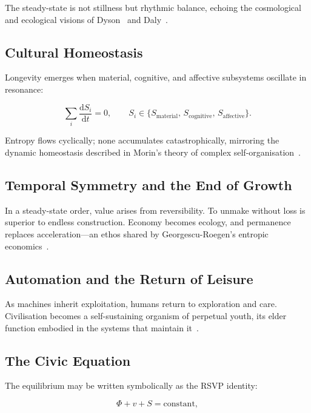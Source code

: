 \documentclass[12pt,a4paper]{article}
\theoremstyle{definition}
\newcommand{\ddt}[1]{\frac{\mathrm{d}#1}{\mathrm{d}t}}
\begin{document}
The steady-state is not stillness but rhythmic balance, echoing the cosmological
and ecological visions of Dyson~\citeyearpar{dyson1979} and
Daly~\citeyearpar{daly2020}.

\subsection{Cultural Homeostasis}

Longevity emerges when material, cognitive, and affective subsystems oscillate
in resonance:

\begin{equation}
  \sum_i \ddt{S_i} = 0, \qquad
  S_i \in \{S_{\mathrm{material}},\, S_{\mathrm{cognitive}},\,
             S_{\mathrm{affective}}\}.
\end{equation}

Entropy flows cyclically; none accumulates catastrophically, mirroring the
dynamic homeostasis described in Morin's theory of complex self-organisation~\citep{morin2008}.

\subsection{Temporal Symmetry and the End of Growth}

In a steady-state order, value arises from reversibility.  To unmake without
loss is superior to endless construction.  Economy becomes ecology, and
permanence replaces acceleration---an ethos shared by Georgescu-Roegen's
entropic economics~\citep{georgesuroegen1971}.

\subsection{Automation and the Return of Leisure}

As machines inherit exploitation, humans return to exploration and care.
Civilisation becomes a self-sustaining organism of perpetual youth, its elder
function embodied in the systems that maintain it~\citep{capraluisi2021,
stewart1999}.

\subsection{The Civic Equation}

The equilibrium may be written symbolically as the RSVP identity:

\begin{equation}
  \Phi + v + S = \mathrm{constant},
  \label{eq:RSVP}
\end{equation}
\end{document}
